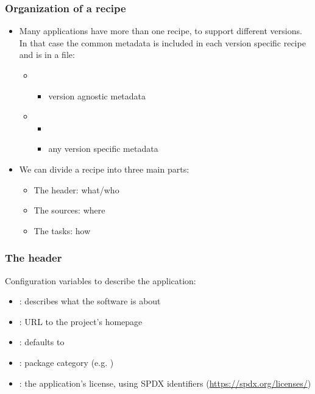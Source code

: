 \begin{frame}
  \frametitle{Organization of a recipe}
  \begin{itemize}
    \item Many applications have more than one recipe, to support
      different versions. In that case the common metadata is
      included in each version specific recipe and is in a 
      file:
      \begin{itemize}
        \item {}
          \begin{itemize}
            \item version agnostic metadata
          \end{itemize}
        \item {}
          \begin{itemize}
            \item {}
            \item any version specific metadata
          \end{itemize}
      \end{itemize}
    \item We can divide a recipe into three main parts:
      \begin{itemize}
        \item The header: what/who
        \item The sources: where
        \item The tasks: how
      \end{itemize}
  \end{itemize}
\end{frame}

\begin{frame}
  \frametitle{The header}
  Configuration variables to describe the application:
  \begin{itemize}
    \item {}: describes what the software is about
    \item {}: URL to the project's homepage
    \item {}: defaults to 
    \item {}: package category (e.g. )
    \item {}: the application's license, using SPDX identifiers
      (\url{https://spdx.org/licenses/})
  \end{itemize}
\end{frame}

